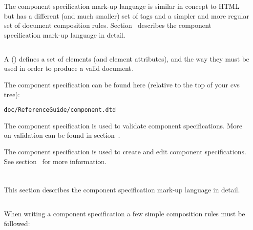 \documentclass[11pt]{article}
\begin{document}
The component specification mark-up language is similar in concept to HTML but
has a different (and much smaller) set of tags and a simpler and more
regular set of document composition rules.
Section~\sechyperref{\SECcontent} describes
the component specification mark-up language in detail.

\subsection{\SUBSECwhatDtd}
\label{\SUBSECwhatDtd}

A  (\dtd) defines a set of elements (and
element attributes), and the way they must be used in order to produce a
valid \xml{} document.

The component specification \dtd{} can be found here (relative to the top
of your cvs tree):

\begin{verbatim}
doc/ReferenceGuide/component.dtd
\end{verbatim}

The component specification \dtd{} is used to validate component
specifications.  More on validation can be found in
section~\sechyperref{\SECvalidation}.

The component specification \dtd{} is used to create and edit component
specifications.  See
section~\sechyperref{\SECediting} for more
information.

\section{\SECcontent}
\label{\SECcontent}

This section describes the component specification mark-up language in
detail.

\subsection{\SUBSECrules}
\label{\SUBSECrules}

When writing a component specification a few simple composition rules
must be followed:
\end{document}
